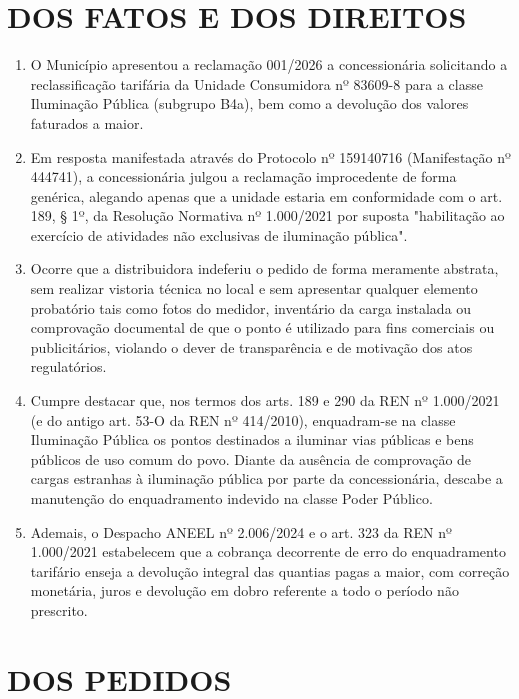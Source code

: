 \newcommand{\tipoRequerimento}{Contestação do Indeferimento de Reclassificação Tarifária para Iluminação Pública}

\section{DOS FATOS E DOS DIREITOS}

\begin{enumerate}[resume]
\item O Município apresentou a reclamação 001/2026 a concessionária solicitando a reclassificação tarifária da Unidade Consumidora nº 83609-8 para a classe Iluminação Pública (subgrupo B4a), bem como a devolução dos valores faturados a maior.
\item Em resposta manifestada através do Protocolo nº 159140716 (Manifestação nº 444741), a concessionária julgou a reclamação improcedente de forma genérica, alegando apenas que a unidade estaria em conformidade com o art. 189, § 1º, da Resolução Normativa nº 1.000/2021 por suposta "habilitação ao exercício de atividades não exclusivas de iluminação pública".
\item Ocorre que a distribuidora indeferiu o pedido de forma meramente abstrata, sem realizar vistoria técnica no local e sem apresentar qualquer elemento probatório tais como fotos do medidor, inventário da carga instalada ou comprovação documental de que o ponto é utilizado para fins comerciais ou publicitários, violando o dever de transparência e de motivação dos atos regulatórios.
\item Cumpre destacar que, nos termos dos arts. 189 e 290 da REN nº 1.000/2021 (e do antigo art. 53-O da REN nº 414/2010), enquadram-se na classe Iluminação Pública os pontos destinados a iluminar vias públicas e bens públicos de uso comum do povo. Diante da ausência de comprovação de cargas estranhas à iluminação pública por parte da concessionária, descabe a manutenção do enquadramento indevido na classe Poder Público.
\item Ademais, o Despacho ANEEL nº 2.006/2024 e o art. 323 da REN nº 1.000/2021 estabelecem que a cobrança decorrente de erro do enquadramento tarifário enseja a devolução integral das quantias pagas a maior, com correção monetária, juros e devolução em dobro referente a todo o período não prescrito.
\end{enumerate}

\section{DOS PEDIDOS}


